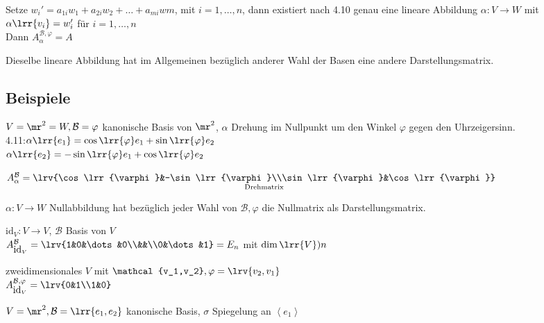 			Setze $w_i'=a_{1i}w_1+a_{2i}w_2+\dots+a_{mi}w{m}$, mit $i=1,\dots,n$, dann existiert nach 4.10 genau eine lineare Abbildung $\alpha:V\rightarrow W$ mit $\alpha\lrr{v_i}=w_i'$ für $i=1,\dots,n$\\
			Dann $A_{\alpha}^{\mathcal{B}, \varphi}=A$
		\item Dieselbe lineare Abbildung hat im Allgemeinen bezüglich anderer Wahl der Basen eine andere Darstellungsmatrix.
	\subExEnd
	
\subsection{Beispiele}
		\item $V=\mr^2=W, \mathcal{B}=\varphi$ kanonische Basis von $\mr^2$, $\alpha$ Drehung im Nullpunkt um den Winkel $\varphi$ gegen den Uhrzeigersinn.\\
			4.11:$\alpha\lrr{e_1}=\cos\lrr{\varphi}e_1+\sin\lrr{\varphi}e_2$\\
			$\alpha\lrr{e_2}=-\sin\lrr{\varphi}e_1+\cos\lrr{\varphi}e_2$
			
			$A_{\alpha}^{\mathcal{B}}=\underset{\mbox{\scriptsize Drehmatrix}}{\lrv{\cos\lrr{\varphi}&-\sin\lrr{\varphi}\\\sin\lrr{\varphi}&\cos\lrr{\varphi}}}$
		\item $\alpha:V\rightarrow W$ Nullabbildung hat bezüglich jeder Wahl von $\mathcal{B},\varphi$ die Nullmatrix als Darstellungsmatrix.
		\item $\mbox{id}_V:V\rightarrow V$, $\mathcal{B}$ Basis von $V$\\
			$A_{\mbox{id}_V}^{\mathcal{B}}=\lrv{1&0&\dots&0\\&&\\0&\dots&1}=E_n$ mit $\dim\lrr{V})n$
		\item zweidimensionales $V$ mit $\mathcal{v_1,v_2},\varphi=\lrv{v_2,v_1}$\\
			$A_{\mbox{id}_V}^{\mathcal{B},\varphi}=\lrv{0&1\\1&0}$
		\item $V=\mr^2,\mathcal{B}=\lrr{e_1,e_2}$ kanonische Basis, $\sigma$ Spiegelung an $\left\langle e_1\right\rangle$


